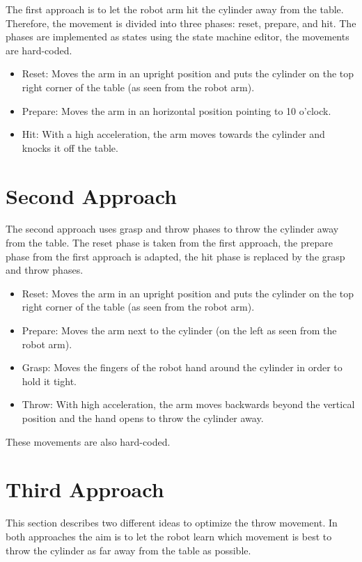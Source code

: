 \documentclass[10pt,twocolumn,letterpaper]{article}
\begin{document}
The first approach is to let the robot arm hit the cylinder away from the table. Therefore, the movement is divided into three phases: reset, prepare, and hit. The phases are implemented as states using the state machine editor, the movements are hard-coded.

\begin{itemize}
\item Reset: Moves the arm in an upright position and puts the cylinder on the top right corner of the table (as seen from the robot arm).
\item Prepare: Moves the arm in an horizontal position pointing to 10 o'clock.
\item Hit: With a high acceleration, the arm moves towards the cylinder and knocks it off the table.
\end{itemize}

\section{Second Approach} \label{sec:secondApproach}

The second approach uses grasp and throw phases to throw the cylinder away from the table. The reset phase is taken from the first approach, the prepare phase from the first approach is adapted, the hit phase is replaced by the grasp and throw phases.
\begin{itemize}
\item Reset: Moves the arm in an upright position and puts the cylinder on the top right corner of the table (as seen from the robot arm).
\item Prepare: Moves the arm next to the cylinder (on the left as seen from the robot arm).
\item Grasp: Moves the fingers of the robot hand around the cylinder in order to hold it tight.
\item Throw: With high acceleration, the arm moves backwards beyond the vertical position and the hand opens to throw the cylinder away.
\end{itemize}

These movements are also hard-coded.

\section{Third Approach} \label{sec:thirdApproach}

This section describes two different ideas to optimize the throw movement. In both approaches the aim is to let the robot learn which movement is best to throw the cylinder as far away from the table as possible.
\end{document}
